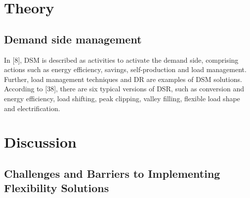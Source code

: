 \section{Theory}
\subsection{Demand side management}
In [8], DSM is described as activities to activate the demand side, comprising actions such as energy efficiency, savings, self-production and load management. Further, load management techniques and DR are examples of DSM solutions. According to [38], there are six typical versions of DSR, such as conversion and energy efficiency, load shifting, peak clipping, valley filling, flexible load shape and electrification. \cite{degefa_comprehensive_2021}


\section{Discussion}
\subsection{Challenges and Barriers to Implementing Flexibility Solutions}
